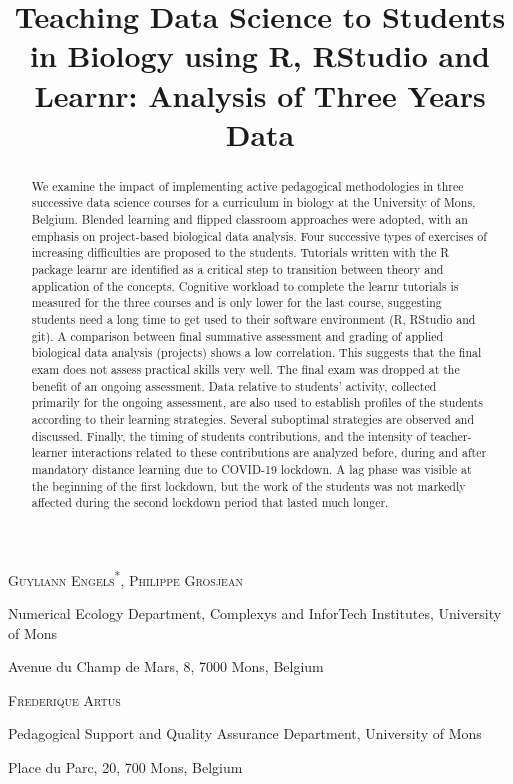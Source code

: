 \documentclass{aims}
\title[Teaching Data Science in
Biology] %
      {Teaching Data Science to Students in Biology using R, RStudio and
Learnr: Analysis of Three Years Data}
\author[Guyliann Engels, Philippe Grosjean and Frédérique Artus]{}
\theoremstyle{definition}
\begin{document}
\maketitle

\centerline{\scshape Guyliann Engels\textsuperscript{*}, Philippe Grosjean}
\medskip
{\footnotesize
 \centerline{Numerical Ecology Department, Complexys and InforTech Institutes, University of Mons}
   \centerline{Avenue du Champ de Mars, 8, 7000 Mons, Belgium}
} %

\medskip

\centerline{\scshape Frederique Artus}

\medskip
{\footnotesize
 \centerline{ Pedagogical Support and Quality Assurance Department, University of Mons}
   \centerline{Place du Parc, 20, 700 Mons, Belgium}
}

\bigskip



\begin{abstract}
  We examine the impact of implementing active pedagogical methodologies
  in three successive data science courses for a curriculum in biology
  at the University of Mons, Belgium. Blended learning and flipped
  classroom approaches were adopted, with an emphasis on project-based
  biological data analysis. Four successive types of exercises of
  increasing difficulties are proposed to the students. Tutorials
  written with the R package learnr are identified as a critical step to
  transition between theory and application of the concepts. Cognitive
  workload to complete the learnr tutorials is measured for the three
  courses and is only lower for the last course, suggesting students
  need a long time to get used to their software environment (R, RStudio
  and git). A comparison between final summative assessment and grading
  of applied biological data analysis (projects) shows a low
  correlation. This suggests that the final exam does not assess
  practical skills very well. The final exam was dropped at the benefit
  of an ongoing assessment. Data relative to students' activity,
  collected primarily for the ongoing assessment, are also used to
  establish profiles of the students according to their learning
  strategies. Several suboptimal strategies are observed and discussed.
  Finally, the timing of students contributions, and the intensity of
  teacher-learner interactions related to these contributions are
  analyzed before, during and after mandatory distance learning due to
  COVID-19 lockdown. A lag phase was visible at the beginning of the
  first lockdown, but the work of the students was not markedly affected
  during the second lockdown period that lasted much longer.
\end{abstract}
\end{document}
